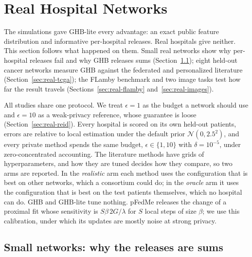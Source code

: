 \section{Real Hospital Networks}\label{sec:real}

The simulations gave GHB-lite every advantage: an exact public feature distribution and informative per-hospital releases. Real hospitals give neither. This section follows what happened on them. Small real networks show why per-hospital releases fail and why GHB releases sums (Section~\ref{sec:real-eight}); eight held-out cancer networks measure GHB against the federated and personalized literature (Section~\ref{sec:real-tcga}); the FLamby benchmark and two image tasks test how far the result travels (Sections~\ref{sec:real-flamby} and~\ref{sec:real-images}).

All studies share one protocol. We treat $\epsilon=1$ as the budget a network should use and $\epsilon=10$ as a weak-privacy reference, whose guarantee is loose (Section~\ref{sec:real-reid}). Every hospital is scored on its own held-out patients, errors are relative to local estimation under the default prior $\mathcal{N}(0,2.5^2)$, and every private method spends the same budget, $\epsilon\in\{1,10\}$ with $\delta=10^{-5}$, under zero-concentrated accounting. The literature methods have grids of hyperparameters, and how they are tuned decides how they compare, so two arms are reported. In the \emph{realistic} arm each method uses the configuration that is best on other networks, which a consortium could do; in the \emph{oracle} arm it uses the configuration that is best on the test patients themselves, which no hospital can do. GHB and GHB-lite tune nothing. pFedMe \cite{tdinh2020personalized} releases the change of a proximal fit whose sensitivity is $S\beta\,2G/\lambda$ for $S$ local steps of size $\beta$; we use this calibration, under which its updates are mostly noise at strong privacy.

\subsection{Small networks: why the releases are sums}\label{sec:real-eight}

